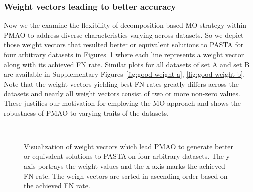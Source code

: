 \subsubsection{Weight vectors leading to better accuracy}
Now we the examine the flexibility of decomposition-based MO strategy within PMAO to address diverse characteristics varying across datasets. So we depict those weight vectors that resulted better or equivalent solutions to PASTA for four arbitrary datasets in Figures~\ref{fig:good-weight} where each line represents a weight vector along with its achieved FN rate. Similar plots for all datasets of set A and set B are available in Supplementary Figures~\ref{fig:good-weight-a}, \ref{fig:good-weight-b}. Note that the weight vectors yielding best FN rates greatly differs across the datasets and nearly all weight vectors consist of two or more non-zero values. These justifies our motivation for employing the MO approach and shows the robustness of PMAO to varying traits of the datasets. 

\begin{figure}[!htbp]%
	\begin{adjustwidth}{-1cm}{}
		\centering
		\\
	\end{adjustwidth}
	\caption{Visualization of weight vectors which lead PMAO to generate better or equivalent solutions to PASTA on four arbitrary datasets. The y-axis portrays the weight values and the x-axis marks the achieved FN rate. The weigh vectors are sorted in ascending order based on the achieved FN rate. }
	\label{fig:good-weight}
\end{figure}


